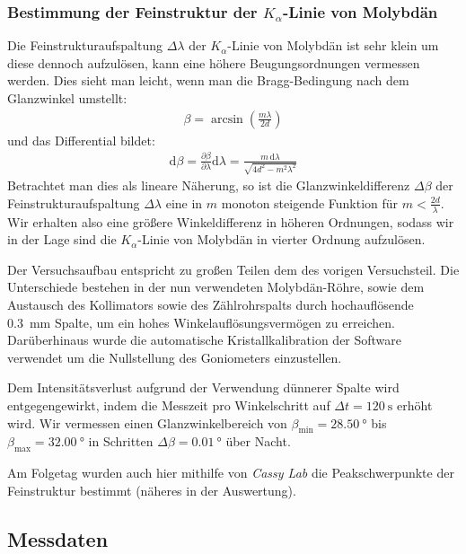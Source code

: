 \documentclass[10pt, a4paper]{article}
\begin{document}
\subsubsection{Bestimmung der Feinstruktur der $K_\alpha$-Linie von Molybdän}
Die Feinstrukturaufspaltung $\Delta \lambda$ der $K_\alpha$-Linie von Molybdän ist sehr klein um diese dennoch aufzulösen, kann eine höhere Beugungsordnungen vermessen werden.
Dies sieht man leicht, wenn man die Bragg-Bedingung nach dem Glanzwinkel umstellt:
\begin{align}
  \beta = \arcsin \left( \frac{m \lambda}{2 d} \right)
\end{align}
und das Differential bildet:
\begin{align}
  \mathrm{d}\beta = \frac{\partial \beta}{\partial \lambda} \mathrm{d}\lambda = \frac{m\, \mathrm{d}\lambda}{\sqrt{4 d^2 - m^2 \lambda^2}}
\end{align}
Betrachtet man dies als lineare Näherung, so ist die Glanzwinkeldifferenz $\Delta \beta$ der Feinstrukturaufspaltung $\Delta \lambda$ eine in $m$ monoton steigende Funktion für $m < \frac{2d}{\lambda}$.
Wir erhalten also eine größere Winkeldifferenz in höheren Ordnungen, sodass wir in der Lage sind die $K_\alpha$-Linie von Molybdän in vierter Ordnung aufzulösen.

Der Versuchsaufbau entspricht zu großen Teilen dem des vorigen Versuchsteil.
Die Unterschiede bestehen in der nun verwendeten Molybdän-Röhre, sowie dem Austausch des Kollimators sowie des Zählrohrspalts durch hochauflösende \SI{0,3}{\milli\metre} Spalte, um ein hohes Winkelauflösungsvermögen zu erreichen.
Darüberhinaus wurde die automatische Kristallkalibration der Software verwendet um die Nullstellung des Goniometers einzustellen.

Dem Intensitätsverlust aufgrund der Verwendung dünnerer Spalte wird entgegengewirkt, indem die Messzeit pro Winkelschritt auf $\Delta t = \SI{120}{\second}$ erhöht wird.
Wir vermessen einen Glanzwinkelbereich von $\beta_\mathrm{min} = \SI{28,50}{\degree}$ bis $\beta_\mathrm{max} = \SI{32,00}{\degree}$ in Schritten $\Delta \beta = \SI{0,01}{\degree}$ über Nacht.

Am Folgetag wurden auch hier mithilfe von \emph{Cassy Lab} die Peakschwerpunkte der Feinstruktur bestimmt (näheres in der Auswertung).

\newpage
\subsection{Messdaten}
\end{document}
